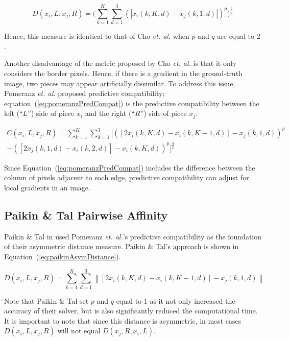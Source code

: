 \documentclass{report}
\def\eref#1{(\ref{#1})}
\newcommand{\norm}[1]{\left\lVert#1\right\rVert}
\begin{document}
\begin{equation} \label{eq:pomeranzPairwise}
D(x_i,L,x_j,R) = \bigg(\sum_{k=1}^{K}\sum_{d=1}^{3}(|x_i(k,K,d) - x_j(k,1,d)|)^p\bigg)^{\frac{q}{p}}
\end{equation}

Hence, this measure is identical to that of Cho \textit{et. al.} when $p$ and $q$ are equal to $2$.

Another disadvantage of the metric proposed by Cho \textit{et. al.} is that it only considers the border pixels.  Hence, if there is a gradient in the ground-truth image, two pieces may appear artificially dissimilar.  To address this issue, Pomeranz \textit{et. al.} proposed predictive compatibility; equation~\eref{eq:pomeranzPredCompat} is the predictive compatibility between the left (``$L$'') side of piece $x_i$ and the right (``$R$'') side of piece $x_j$.  

\begin{equation} \label{eq:pomeranzPredCompat}
\begin{split}
C(x_i,L,x_j,R) = \sum_{k=1}^{K}\sum_{d=1}^{3}\Big[ ([2x_i(k, K, d) - x_i(k, K-1, d)] - x_j(k, 1, d))^p \\ - ([2x_j(k, 1, d) - x_i(k, 2, d)] - x_i(k, K, d))^p\Big]^{\frac{q}{p}}
\end{split}
\end{equation}

Since Equation~\eref{eq:pomeranzPredCompat} includes the difference between the column of pixels adjacent to each edge, predictive compatibility can adjust for local gradients in an image.

\subsection{Paikin \& Tal Pairwise Affinity}\label{sec:paikinPairwiseAffinity}

Paikin \& Tal in \cite{paikin2015} used Pomeranz \textit{et. al.}'s predictive compatibility as the foundation of their asymmetric distance measure.  Paikin \& Tal's approach is shown in Equation~\eref{eq:paikinAsymDistance}.

\begin{equation} \label{eq:paikinAsymDistance}
D(x_i,L,x_j,R) = \sum_{k=1}^{K}\sum_{d=1}^{3} \norm{[2x_i(k, K, d) - x_i(k, K-1, d)] - x_j(k, 1, d)}
\end{equation}

Note that Paikin \& Tal set $p$ and $q$ equal to 1 as it not only increased the accuracy of their solver, but is also significantly reduced the computational time.  It is important to note that since this distance is asymmetric, in most cases $D(x_i,L,x_j,R)$ will not equal $D(x_j,R,x_i,L)$.
\end{document}
